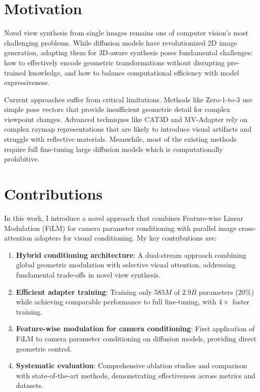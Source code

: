 \label{chapter:introduction}

\section{Motivation}

Novel view synthesis from single images remains one of computer vision's most challenging problems. While diffusion models have revolutionized 2D image generation, adapting them for 3D-aware synthesis poses fundamental challenges: how to effectively encode geometric transformations without disrupting pre-trained knowledge, and how to balance computational efficiency with model expressiveness.

Current approaches suffer from critical limitations. Methods like Zero-1-to-3 \cite{zero1to3} use simple pose vectors that provide insufficient geometric detail for complex viewpoint changes. Advanced techniques like CAT3D \cite{cat3d} and MV-Adapter \cite{mvadapter} rely on complex raymap representations that are likely to introduce visual artifacts and struggle with reflective materials. Meanwhile, most of the existing methods require full fine-tuning large diffusion models which is computationally prohibitive.


\section{Contributions}

In this work, I introduce a novel approach that combines Feature-wise Linear Modulation (FiLM) \cite{film} for camera parameter conditioning with parallel image cross-attention adapters for visual conditioning. My key contributions are:

\begin{enumerate}
  \item \textbf{Hybrid conditioning architecture}: A dual-stream approach combining global geometric modulation with selective visual attention, addressing fundamental trade-offs in novel view synthesis.
  \item \textbf{Efficient adapter training}: Training only $585M$ of $2.9B$ parameters (20\%) while achieving comparable performance to full fine-tuning, with $4\times$ faster training.
  \item \textbf{Feature-wise modulation for camera conditioning}: First application of FiLM to camera parameter conditioning on diffusion models, providing direct geometric control.
  \item \textbf{Systematic evaluation}: Comprehensive ablation studies and comparison with state-of-the-art methods, demonstrating effectiveness across metrics and datasets.
\end{enumerate}

